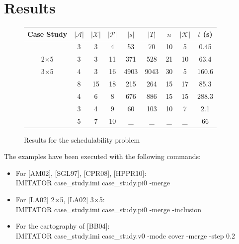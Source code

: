 \documentclass{article}
\begin{document}
\section{Results}
\begin{figure}[!ht]
\begin{tabular}{|c|c|c|c|c|c|c|c|c|}
\hline
Case Study & $|\mathcal{A}|$ & $|\mathcal{X}|$ & $|\mathcal{P}|$ & $|s|$ & $|T|$ & $n$ & $|\mathcal{K}|$ & $t$ (s) \\
\hline
[AM02] 	&3&	3& 	4& 	53& 	70& 	10& 	5& 	0.45\\
\hline 
[LA02] 2$\times$5	&3&	3&	11&	371&	528&	21&	10&	63.4\\
\hline
[LA02] 3$\times$5&	4&	3&	16&	4903&	9043&	30&	5	&160.6\\
\hline
[SGL97]		 &8& 	15& 	18& 	215& 	264& 	15& 	17& 	85.3\\
\hline
[CPR08] &4 &	6 &	8 &	676& 	886& 	15& 	15& 	288.3\\
\hline
[HPPR10] &3 &	4 &	9 &	60& 	103& 	10& 	7& 	2.1\\
\hline
[BB04]	&5&	7&	10&	\_&	\_&	\_&	\_&	66\\
\hline
\end{tabular}
\caption{Results for the schedulability problem}
\end{figure}
The examples have been executed with the following commands:
\begin{itemize}
 \item For [AM02], [SGL97], [CPR08], [HPPR10]:\\ IMITATOR case\_study.imi case\_study.pi0 -merge 
 \item For [LA02] 2$\times$5, [LA02] 3$\times$5:\\ IMITATOR case\_study.imi case\_study.pi0 -merge -inclusion 
 \item For the cartography of [BB04]:\\ IMITATOR case\_study.imi case\_study.v0 -mode cover -merge -step 0.2 
\end{itemize}


\end{document}
